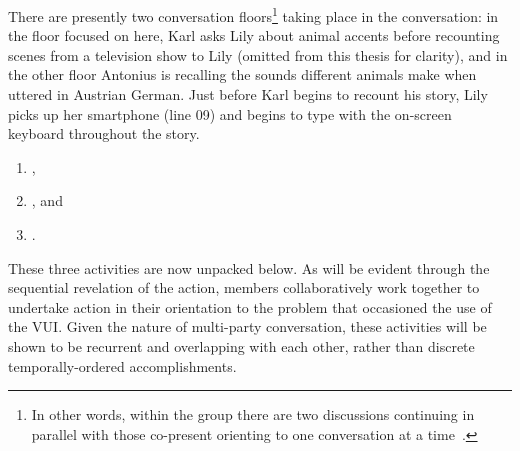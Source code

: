 \begin{revisedsubmission}
There are presently two conversation floors\footnote{In other words, within the group there are two discussions continuing in parallel with those co-present orienting to one conversation at a time~\citep{Edelsky1981}.} taking place in the conversation: in the floor focused on here, Karl asks Lily about animal accents before recounting scenes from a television show to Lily (omitted from this thesis for clarity), and in the other floor Antonius is recalling the sounds different animals make when uttered in Austrian German.
Just before Karl begins to recount his story, Lily picks up her smartphone (line 09) and begins to type with the on-screen keyboard throughout the story.
\begin{revisedsubmission}
\begin{enumerate}[label=(\roman*)]
    \item {},
    \item {}, and
    \item {}.
\end{enumerate}
\end{revisedsubmission}

These three activities are now unpacked below.
As will be evident through the sequential revelation of the action, members collaboratively work together to undertake action in their orientation to the problem that occasioned the use of the \ac{VUI}.
Given the nature of multi-party conversation, these activities will be shown to be recurrent and overlapping with each other, rather than discrete temporally-ordered accomplishments.
\end{revisedsubmission}






